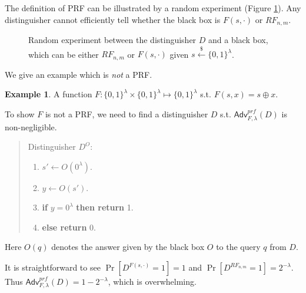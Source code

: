 \documentclass[12pt]{article}
\newcommand{\bits}{\{0,1\}}
\newcommand{\getsr}{\stackrel{\$}{\gets}}
\newcommand{\Adv}{\mathsf{Adv}}
\theoremstyle{definition}
\newtheorem{example}[theorem]{Example}
\begin{document}
The definition of PRF can be illustrated by a random experiment (Figure \ref{fig:re}). Any distinguisher cannot efficiently tell whether the black box is $F(s,\cdot)$ or $RF_{n,m}$.

\begin{figure}[!t]
\centering{}
\caption{Random experiment between the distinguisher $D$ and a black box, which can be either $RF_{n,m}$ or $F(s,\cdot)$ given $s\getsr\bits^\lambda$.}
\label{fig:re}
\end{figure}

We give an example which is \emph{not} a PRF.
\begin{example}
A function $F : \bits^\lambda \times \bits^\lambda \mapsto \bits^{\lambda}$ s.t. $F(s,x) = s \oplus x$.

To show $F$ is not a PRF, we need to find a distinguisher $D$ s.t. $\Adv_{F,\lambda}^{prf}(D)$ is non-negligible.
\begin{quote}
Distinguisher $D^O$:
\begin{enumerate}
\item $s' \gets O(0^\lambda)$.
\item $y \gets O(s')$.
\item {\bf if} $y=0^\lambda$ {\bf then return} 1.
\item {\bf else return} 0.
\end{enumerate}
\end{quote}
Here $O(q)$ denotes the answer given by the black box $O$ to the query $q$ from $D$.

It is straightforward to see $\Pr[D^{F(s,\cdot)}=1]=1$ and $\Pr[D^{RF_{n,m}}=1]=2^{-\lambda}$. Thus $\Adv_{F,\lambda}^{prf}(D)=1-2^{-\lambda}$, which is overwhelming.
\end{example}
\end{document}
